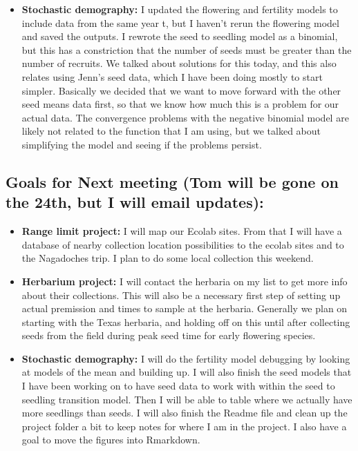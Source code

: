 \documentclass{article}
\begin{document}
\begin{itemize}
\item{\textbf{Stochastic demography:} I updated the flowering and fertility models to include data from the same year t, but I haven't rerun the flowering model and saved the outputs. I rewrote the seed to seedling model as a binomial, but this has a constriction that the number of seeds must be greater than the number of recruits. We talked about solutions for this today, and this also relates using Jenn's seed data, which I have been doing mostly to start simpler. Basically we decided that we want to move forward with the other seed means data first, so that we know how much this is a problem for our actual data. The convergence problems with the negative binomial model are likely not related to the function that I am using, but we talked about simplifying the model and seeing if the problems persist.}
\end{itemize}

\subsection*{Goals for Next meeting (Tom will be gone on the 24th, but I will email updates):}
\begin{itemize}
\item{\textbf{Range limit project:} I will map our Ecolab sites. From that I will have a database of nearby collection location possibilities to the ecolab sites and to the Nagadoches trip. I plan to do some local collection this weekend.}
\item{\textbf{Herbarium project:} I will contact the herbaria on my list to get more info about their collections. This will also be a necessary first step of setting up actual premission and times to sample at the herbaria. Generally we plan on starting with the Texas herbaria, and holding off on this until after collecting seeds from the field during peak seed time for early flowering species.}
\item{\textbf{Stochastic demography:} I will do the fertility model debugging by looking at models of the mean and building up. I will also finish the seed models that I have been working on to have seed data to work with within the seed to seedling transition model. Then I will be able to table where we actually have more seedlings than seeds. I will also finish the Readme file and clean up the project folder a bit to keep notes for where I am in the project. I also have a goal to move the figures into Rmarkdown.}
\end{itemize}
 
\end{document}
